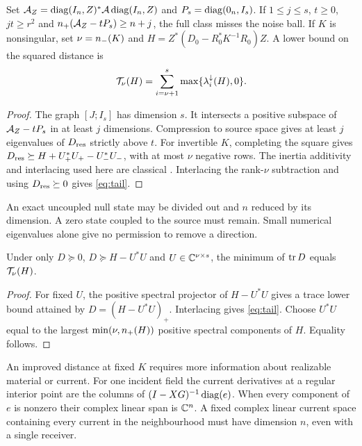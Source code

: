 \begin{proposition}\label{prop:count}
Set $\mathcal A_Z=\operatorname{diag}(I_n,Z)^*\mathcal A\operatorname{diag}(I_n,Z)$ and $P_s=\operatorname{diag}(0_n,I_s)$. If $1\leq j\leq s$, $t\geq0$, $jt\geq r^2$ and $n_+(\mathcal A_Z-tP_s)\geq n+j$, the full class misses the noise ball. If $K$ is nonsingular, set $\nu=n_-(K)$ and $H=Z^*(D_0-R_0^*K^{-1}R_0)Z$. A lower bound on the squared distance is
\begin{equation}
 \mathcal T_\nu(H)=\sum_{i=\nu+1}^{s}\max\{\lambda_i^\downarrow(H),0\}.
 \label{eq:tail}
\end{equation}
\end{proposition}
\begin{proof}
The graph $[J;I_s]$ has dimension $s$. It intersects a positive subspace of $\mathcal A_Z-tP_s$ in at least $j$ dimensions. Compression to source space gives at least $j$ eigenvalues of $D_{\rm res}$ strictly above $t$. For invertible $K$, completing the square gives $D_{\rm res}\succeq H+U_+^*U_+-U_-^*U_-$, with at most $\nu$ negative rows. The inertia additivity and interlacing used here are classical \cite{haynsworth,tian,fan}. Interlacing the rank-$\nu$ subtraction and using $D_{\rm res}\succeq0$ gives \eqref{eq:tail}.
\end{proof}
An exact uncoupled null state may be divided out and $n$ reduced by its dimension. A zero state coupled to the source must remain. Small numerical eigenvalues alone give no permission to remove a direction.

\begin{proposition}\label{prop:sharp}
Under only $D\succeq0$, $D\succeq H-U^*U$ and $U\in\mathbb C^{\nu\times s}$, the minimum of $\operatorname{tr} D$ equals $\mathcal T_\nu(H)$.
\end{proposition}
\begin{proof}
For fixed $U$, the positive spectral projector of $H-U^*U$ gives a trace lower bound attained by $D=(H-U^*U)_+$. Interlacing gives \eqref{eq:tail}. Choose $U^*U$ equal to the largest $\min(\nu,n_+(H))$ positive spectral components of $H$. Equality follows.
\end{proof}
An improved distance at fixed $K$ requires more information about realizable material or current. For one incident field the current derivatives at a regular interior point are the columns of $(I-XG)^{-1}\operatorname{diag}(e)$. When every component of $e$ is nonzero their complex linear span is $\mathbb C^n$. A fixed complex linear current space containing every current in the neighbourhood must have dimension $n$, even with a single receiver.

